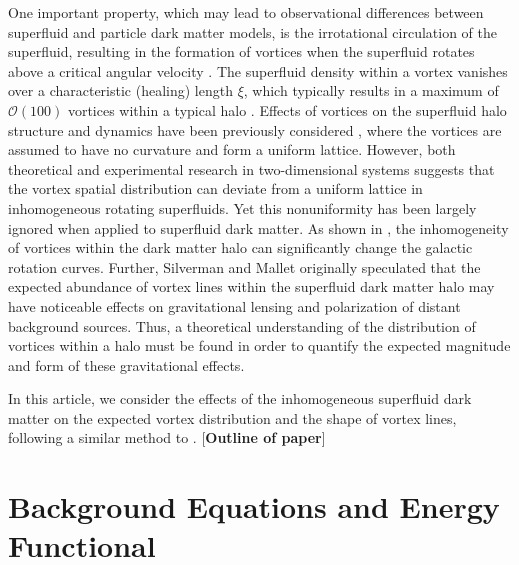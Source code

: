 \documentclass[aps,prd,twocolumn,nofootinbib,superscriptaddress]{revtex4-1}
\begin{document}
One important property, which may lead to observational differences between superfluid and particle dark matter models, is the irrotational circulation of the superfluid, resulting in the formation of vortices when the superfluid rotates above a critical angular velocity \cite{Fetter}.  The superfluid density within a vortex vanishes over a characteristic (healing) length $\xi$, which typically results in a maximum of $\mathcal{O}(100)$ vortices within a typical halo \cite{Silverman:2002qx,Yu:2002,Kain:2010rb,RindlerDaller:2011kx}.  Effects of vortices on the superfluid halo structure and dynamics have been previously considered \cite{Kain:2010rb,RindlerDaller:2011kx,Zinner:2011if,RindlerDaller:2012vj,Banik:2013rxa}, where the vortices are assumed to have no curvature and form a uniform lattice.  However, both theoretical \cite{Sheehy:2004a,Sheehy:2004b,Watanabe:2004,Cooper:2004} and experimental \cite{Coddington:2004} research in two-dimensional systems suggests that the vortex spatial distribution can deviate from a uniform lattice in inhomogeneous rotating superfluids.  Yet this nonuniformity has been largely ignored when applied to superfluid dark matter.  As shown in \cite{Yu:2002,Zinner:2011if}, the inhomogeneity of vortices within the dark matter halo can significantly change the galactic rotation curves.  Further, Silverman and Mallet \cite{Silverman:2002qx} originally speculated that the expected abundance of vortex lines within the superfluid dark matter halo may have noticeable effects on gravitational lensing and polarization of distant background sources.  Thus, a theoretical understanding of the distribution of vortices within a halo must be found in order to quantify the expected magnitude and form of these gravitational effects.

In this article, we consider the effects of the inhomogeneous superfluid dark matter on the expected vortex distribution and the shape of vortex lines, following a similar method to \cite{Sheehy:2004a,Sheehy:2004b}. [{\bf Outline of paper}]




\section{Background Equations and Energy Functional}
\label{Sec:Background}
\end{document}
